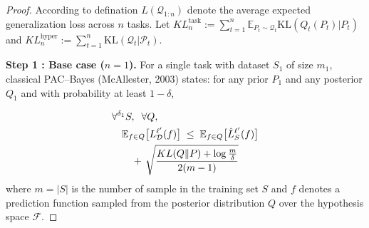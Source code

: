 \documentclass[letterpaper]{article} %
\begin{document}
\begin{proof}
According to defination $L(\mathcal{Q}_{1:n})$ denote the average expected generalization loss across $n$ tasks.
Let $KL^{\text{task}}_n := \sum_{t=1}^n \mathbb{E}_{P_t \sim \mathcal{Q}_t} \mathrm{KL}(Q_t(P_t) | P_t)$ and $KL^{\text{hyper}}_n := \sum_{t=1}^n \mathrm{KL}(\mathcal{Q}_t | \mathcal{P}_t)$.


\textbf{Step 1 : Base case ($n=1$).}  
For a single task with dataset $S_1$ of size $m_1$, classical PAC--Bayes (McAllester, 2003) states: for any prior $P_1$ and any posterior $Q_1$ and with probability at least $1-\delta$,

\begin{equation}\label{eq:PAC2003}
\begin{aligned}
    &\forall^{\delta_1} S,\;\; \forall Q, \\
    &\quad
    \mathbb{E}_{f \in Q}\big[L_{\mathcal{D}}^{\ell'}(f)\big] \;\leq\;
    \mathbb{E}_{f \in Q}\big[\hat{L}^{\ell'}_{S}(f)\big] \\
    &\qquad
    +\, \sqrt{
        \frac{
            KL(Q\|P) + \log\frac{m}{\delta}
        }{
            2(m-1)
        }
    }
\end{aligned}\notag
\end{equation}
where $m=|S|$ is the number of sample in the training set $S$ and $f$ denotes a prediction function sampled from the posterior distribution $Q$ over the hypothesis space $\mathcal{F}$.




\end{proof}
\end{document}

